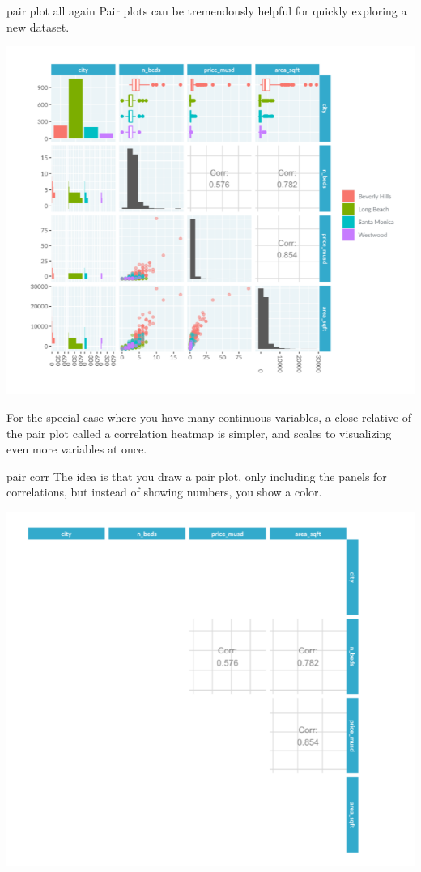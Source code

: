 \documentclass[
  ignorenonframetext,
]{beamer}
\begin{document}
\begin{frame}{pair plot all again}
\label{pair-plot-all-again}
Pair plots can be tremendously helpful for quickly exploring a new
dataset.

\includegraphics{../images/im94.png}

For the special case where you have many continuous variables, a close
relative of the pair plot called a correlation heatmap is simpler, and
scales to visualizing even more variables at once.
\end{frame}

\begin{frame}{pair corr}
\label{pair-corr}
The idea is that you draw a pair plot, only including the panels for
correlations, but instead of showing numbers, you show a color.

\includegraphics{../images/im95.png}
\end{frame}
\end{document}
